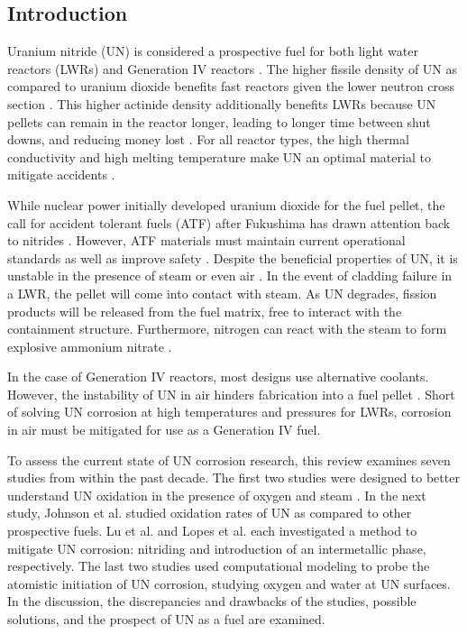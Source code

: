 \documentclass[11pt]{article}
\begin{document}
\begin{multicols}{2}


\section{Introduction}

Uranium nitride (UN) is considered a prospective fuel for both light water reactors (LWRs) and Generation IV reactors \cite{Streit2005,Mizutani1998}. The higher fissile density of UN as compared to uranium dioxide benefits fast reactors given the lower neutron cross section \cite{Silva2009}. This higher actinide density additionally benefits LWRs because UN pellets can remain in the reactor longer, leading to longer time between shut downs, and reducing money lost \cite{Lopes2017}. For all reactor types, the high thermal conductivity and high melting temperature make UN an optimal material to mitigate accidents \cite{Lopes2017}.
\par 
While nuclear power initially developed uranium dioxide for the fuel pellet, the call for accident tolerant fuels (ATF) after Fukushima has drawn attention back to nitrides \cite{Johnson2016}. However, ATF materials must maintain current operational standards as well as improve safety \cite{Zinkle2014}. Despite the beneficial properties of UN, it is unstable in the presence of steam or even air \cite{Lopes2017,Johnson2016,Jolkkonen2017}. In the event of cladding failure in a LWR, the pellet will come into contact with steam. As UN degrades, fission products will be released from the fuel matrix, free to interact with the containment structure. Furthermore, nitrogen can react with the steam to form explosive ammonium nitrate \cite{Jolkkonen2017}.
\par 
 In the case of Generation IV reactors, most designs use alternative coolants. However, the instability of UN in air hinders fabrication into a fuel pellet \cite{Lopes2017}. Short of solving UN corrosion at high temperatures and pressures for LWRs, corrosion in air must be mitigated for use as a Generation IV fuel.
 \par 
 To assess the current state of UN corrosion research, this review examines seven studies from within the past decade. The first two studies were designed to better understand UN oxidation in the presence of oxygen \cite{Liu2013} and steam \cite{Jolkkonen2017}. In the next study, Johnson et al. \cite{Johnson2016} studied oxidation rates of UN as compared to other prospective fuels.  Lu et al. \cite{Lu2016} and Lopes et al. \cite{Lopes2017} each investigated a method to mitigate UN corrosion: nitriding and introduction of an intermetallic phase, respectively. The last two studies used computational modeling to probe the atomistic initiation of UN corrosion, studying oxygen \cite{Bocharov2013} and water \cite{Bo2016} at UN surfaces. In the discussion, the discrepancies and drawbacks of the studies, possible solutions, and the prospect of UN as a fuel are examined.


\end{multicols}
\end{document}
